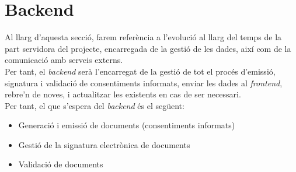 \section{Backend}
\label{desenvolupament:backend}
Al llarg d'aquesta secció, farem referència a l'evolució al llarg del temps de la part servidora del projecte, encarregada de la gestió de les dades, així com de la comunicació amb serveis externs.\\
\newline Per tant, el \textit{backend} serà l'encarregat de la gestió de tot el procés d'emissió, signatura i validació de consentiments informats, enviar les dades al \textit{frontend}, rebre'n de noves, i actualitzar les existents en cas de ser necessari.\\
\newline Per tant, el que s'espera del \textit{backend} és el següent:
\begin{itemize}
    \item Generació i emissió de documents (consentiments informats)
    \item Gestió de la signatura electrònica de documents
    \item Validació de documents
\end{itemize}
\clearpage

\clearpage
